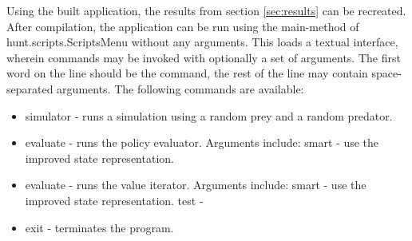 Using the built application, the results from section \ref{sec:results} can be recreated. After compilation, the application can be run using the main-method of hunt.scripts.ScriptsMenu without any arguments. This loads a textual interface, wherein commands may be invoked with optionally a set of arguments. The first word on the line should be the command, the rest of the line may contain space-separated arguments. The following commands are available:

\begin{itemize}
  \item simulator - runs a simulation using a random prey and a random predator.
  \item evaluate - runs the policy evaluator. Arguments include:
    \subitem smart - use the improved state representation.
  \item evaluate - runs the value iterator. Arguments include:
    \subitem smart - use the improved state representation.
     \subitem test - 
  \item exit - terminates the program.
\end{itemize}